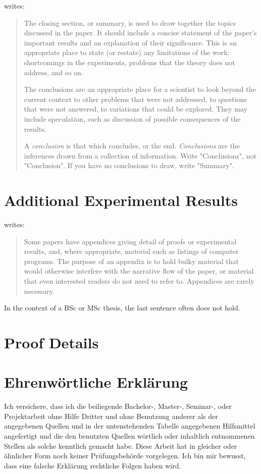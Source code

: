 \documentclass[a4paper,oneside,bibliography=totoc]{scrartcl}
\begin{document}
\citet{zobel2004} writes:

\blockcquote{zobel2004}{%
  The closing section, or summary, is used to draw together the topics discussed
  in the paper. It should include a concise statement of the paper's important
  results and an explanation of their significance. This is an appropriate place
  to state (or restate) any limitations of the work: shortcomings in the
  experiments, problems that the theory does not address, and so on.

  The conclusions are an appropriate place for a scientist to look beyond the
  current context to other problems that were not addressed, to questions that
  were not answered, to variations that could be explored. They may include
  speculation, such as discussion of possible consequences of the results.

  A \emph{conclusion} is that which concludes, or the end. \emph{Conclusions}
  are the inferences drawn from a collection of information. Write
  "Conclusions", not "Conclusion". If you have no conclusions to draw, write
  "Summary".}




\appendix
\section{Additional Experimental Results}

\citet{zobel2004} writes:

\blockcquote{zobel2004}{%
  Some papers have appendices giving detail of proofs or experimental results,
  and, where appropriate, material such as listings of computer programs. The
  purpose of an appendix is to hold bulky material that would otherwise
  interfere with the narrative flow of the paper, or material that even
  interested readers do not need to refer to. Appendices are rarely necessary.}

In the context of a BSc or MSc thesis, the last sentence often does not hold.

\section{Proof Details}


\clearpage
\section*{Ehrenwörtliche Erklärung}

Ich versichere, dass ich die beiliegende Bachelor-, Master-, Seminar-, oder
Projektarbeit ohne Hilfe Dritter und ohne Benutzung anderer als der angegebenen
Quellen und in der untenstehenden Tabelle angegebenen Hilfsmittel angefertigt
und die den benutzten Quellen wörtlich oder inhaltlich entnommenen Stellen als
solche kenntlich gemacht habe. Diese Arbeit hat in gleicher oder ähnlicher Form
noch keiner Prüfungsbehörde vorgelegen. Ich bin mir bewusst, dass eine falsche
Erklärung rechtliche Folgen haben wird.
\end{document}
